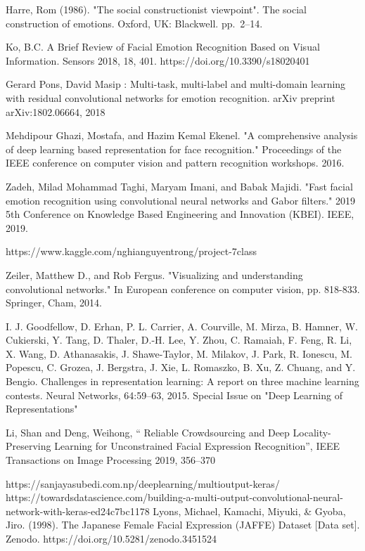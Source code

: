 \documentclass[letterpaper,10pt]{article}
\begin{document}
\begin{thebibliography}{00}
 Harre, Rom (1986). "The social constructionist viewpoint". The social construction of emotions. Oxford, UK: Blackwell. pp. 2–14.

 Ko, B.C. A Brief Review of Facial Emotion Recognition Based on Visual Information. Sensors 2018, 18, 401. https://doi.org/10.3390/s18020401

 Gerard Pons, David Masip : Multi-task, multi-label and multi-domain learning with residual convolutional networks for emotion recognition. arXiv preprint arXiv:1802.06664, 2018

 Mehdipour Ghazi, Mostafa, and Hazim Kemal Ekenel. "A comprehensive analysis of deep learning based representation for face recognition." Proceedings of the IEEE conference on computer vision and pattern recognition workshops. 2016.

 Zadeh, Milad Mohammad Taghi, Maryam Imani, and Babak Majidi. "Fast facial emotion recognition using convolutional neural networks and Gabor filters." 2019 5th Conference on Knowledge Based Engineering and Innovation (KBEI). IEEE, 2019.

 https://www.kaggle.com/nghianguyentrong/project-7class

Zeiler, Matthew D., and Rob Fergus. "Visualizing and understanding convolutional networks." In European conference on computer vision, pp. 818-833. Springer, Cham, 2014.

 I. J. Goodfellow, D. Erhan, P. L. Carrier, A. Courville, M. Mirza, B. Hamner, W. Cukierski, Y. Tang, D. Thaler, D.-H. Lee, Y. Zhou, C. Ramaiah, F. Feng, R. Li, X. Wang, D. Athanasakis, J. Shawe-Taylor, M. Milakov, J. Park, R. Ionescu, M. Popescu, C. Grozea, J. Bergstra, J. Xie, L. Romaszko, B. Xu, Z. Chuang, and Y. Bengio. Challenges in representation learning: A report on three machine learning contests. Neural Networks, 64:59--63, 2015. Special Issue on "Deep Learning of Representations"

Li, Shan and Deng, Weihong, “ Reliable Crowdsourcing and Deep Locality-Preserving Learning for  Unconstrained Facial Expression Recognition”, IEEE Transactions on Image Processing 2019, 356--370

 https://sanjayasubedi.com.np/deeplearning/multioutput-keras/
https://towardsdatascience.com/building-a-multi-output-convolutional-neural-network-with-keras-ed24c7bc1178
 Lyons, Michael, Kamachi, Miyuki, \& Gyoba, Jiro. (1998). The Japanese Female Facial Expression (JAFFE) Dataset [Data set]. Zenodo. https://doi.org/10.5281/zenodo.3451524


\end{thebibliography}
\end{document}
